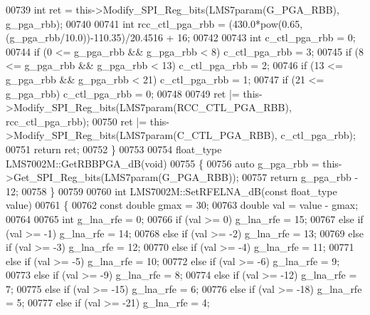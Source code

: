 \begin{DoxyCode}
{{{{{{{{{{{{{{{{{{{{{{{{{00739     \textcolor{keywordtype}{int} ret = this->Modify_SPI_Reg_bits(LMS7param(G_PGA_RBB), g\_pga\_rbb);
00740 
00741     \textcolor{keywordtype}{int} rcc\_ctl\_pga\_rbb = (430.0*pow(0.65, (g\_pga\_rbb/10.0))-110.35)/20.4516 + 16;
00742 
00743     \textcolor{keywordtype}{int} c\_ctl\_pga\_rbb = 0;
00744     \textcolor{keywordflow}{if} (0 <= g\_pga\_rbb && g\_pga\_rbb < 8) c\_ctl\_pga\_rbb = 3;
00745     \textcolor{keywordflow}{if} (8 <= g\_pga\_rbb && g\_pga\_rbb < 13) c\_ctl\_pga\_rbb = 2;
00746     \textcolor{keywordflow}{if} (13 <= g\_pga\_rbb && g\_pga\_rbb < 21) c\_ctl\_pga\_rbb = 1;
00747     \textcolor{keywordflow}{if} (21 <= g\_pga\_rbb) c\_ctl\_pga\_rbb = 0;
00748 
00749     ret |= this->Modify_SPI_Reg_bits(LMS7param(RCC_CTL_PGA_RBB), rcc\_ctl\_pga\_rbb);
00750     ret |= this->Modify_SPI_Reg_bits(LMS7param(C_CTL_PGA_RBB), c\_ctl\_pga\_rbb);
00751     \textcolor{keywordflow}{return} ret;
00752 \}
00753 
00754 float_type LMS7002M::GetRBBPGA_dB(\textcolor{keywordtype}{void})
00755 \{
00756     \textcolor{keyword}{auto} g\_pga\_rbb = this->Get_SPI_Reg_bits(LMS7param(G_PGA_RBB));
00757     \textcolor{keywordflow}{return} g\_pga\_rbb - 12;
00758 \}
00759 
00760 \textcolor{keywordtype}{int} LMS7002M::SetRFELNA_dB(\textcolor{keyword}{const} float_type value)
00761 \{
00762     \textcolor{keyword}{const} \textcolor{keywordtype}{double} gmax = 30;
00763     \textcolor{keywordtype}{double} val = value - gmax;
00764 
00765     \textcolor{keywordtype}{int} g\_lna\_rfe = 0;
00766     \textcolor{keywordflow}{if} (val >= 0) g\_lna\_rfe = 15;
00767     \textcolor{keywordflow}{else} \textcolor{keywordflow}{if} (val >= -1) g\_lna\_rfe = 14;
00768     \textcolor{keywordflow}{else} \textcolor{keywordflow}{if} (val >= -2) g\_lna\_rfe = 13;
00769     \textcolor{keywordflow}{else} \textcolor{keywordflow}{if} (val >= -3) g\_lna\_rfe = 12;
00770     \textcolor{keywordflow}{else} \textcolor{keywordflow}{if} (val >= -4) g\_lna\_rfe = 11;
00771     \textcolor{keywordflow}{else} \textcolor{keywordflow}{if} (val >= -5) g\_lna\_rfe = 10;
00772     \textcolor{keywordflow}{else} \textcolor{keywordflow}{if} (val >= -6) g\_lna\_rfe = 9;
00773     \textcolor{keywordflow}{else} \textcolor{keywordflow}{if} (val >= -9) g\_lna\_rfe = 8;
00774     \textcolor{keywordflow}{else} \textcolor{keywordflow}{if} (val >= -12) g\_lna\_rfe = 7;
00775     \textcolor{keywordflow}{else} \textcolor{keywordflow}{if} (val >= -15) g\_lna\_rfe = 6;
00776     \textcolor{keywordflow}{else} \textcolor{keywordflow}{if} (val >= -18) g\_lna\_rfe = 5;
00777     \textcolor{keywordflow}{else} \textcolor{keywordflow}{if} (val >= -21) g\_lna\_rfe = 4;
}}}}}}}}}}}}}}}}}}}}}}}}}
\end{DoxyCode}
